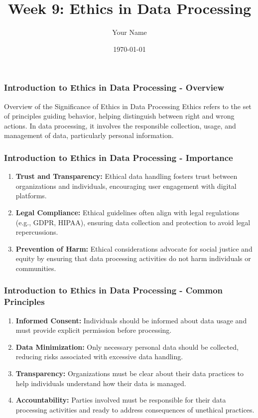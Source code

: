 \documentclass{beamer}
\title{Week 9: Ethics in Data Processing}
\author{Your Name}
\institute{Your Institution}
\date{\today}
\begin{document}
\frame{\titlepage}

\begin{frame}[fragile]
    \frametitle{Introduction to Ethics in Data Processing - Overview}
    \begin{block}{Overview of the Significance of Ethics in Data Processing}
        Ethics refers to the set of principles guiding behavior, helping distinguish between right and wrong actions. 
        In data processing, it involves the responsible collection, usage, and management of data, particularly personal information.
    \end{block}
\end{frame}

\begin{frame}[fragile]
    \frametitle{Introduction to Ethics in Data Processing - Importance}
    \begin{enumerate}
        \item \textbf{Trust and Transparency:} 
        Ethical data handling fosters trust between organizations and individuals, encouraging user engagement with digital platforms.
        
        \item \textbf{Legal Compliance:} 
        Ethical guidelines often align with legal regulations (e.g., GDPR, HIPAA), ensuring data collection and protection to avoid legal repercussions.
        
        \item \textbf{Prevention of Harm:} 
        Ethical considerations advocate for social justice and equity by ensuring that data processing activities do not harm individuals or communities.
    \end{enumerate}
\end{frame}

\begin{frame}[fragile]
    \frametitle{Introduction to Ethics in Data Processing - Common Principles}
    \begin{enumerate}
        \item \textbf{Informed Consent:} 
        Individuals should be informed about data usage and must provide explicit permission before processing.
        
        \item \textbf{Data Minimization:} 
        Only necessary personal data should be collected, reducing risks associated with excessive data handling.
        
        \item \textbf{Transparency:} 
        Organizations must be clear about their data practices to help individuals understand how their data is managed.
        
        \item \textbf{Accountability:}
        Parties involved must be responsible for their data processing activities and ready to address consequences of unethical practices.
    \end{enumerate}
\end{frame}
\end{document}
